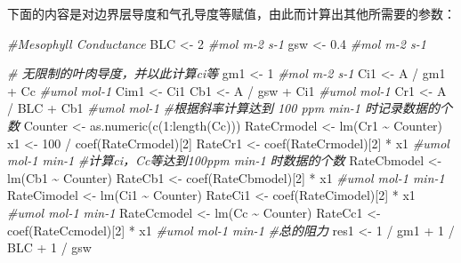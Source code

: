 \documentclass[
]{krantz}
\makeatletter
\newenvironment{Shaded}{\begin{snugshade}}{\end{snugshade}}
\newcommand{\CommentTok}[1]{\textcolor[rgb]{0.56,0.35,0.01}{\textit{#1}}}
\newcommand{\DecValTok}[1]{\textcolor[rgb]{0.00,0.00,0.81}{#1}}
\newcommand{\FloatTok}[1]{\textcolor[rgb]{0.00,0.00,0.81}{#1}}
\newcommand{\FunctionTok}[1]{\textcolor[rgb]{0.00,0.00,0.00}{#1}}
\newcommand{\NormalTok}[1]{#1}
\newcommand{\OtherTok}[1]{\textcolor[rgb]{0.56,0.35,0.01}{#1}}
\newcommand{\SpecialCharTok}[1]{\textcolor[rgb]{0.00,0.00,0.00}{#1}}
\newenvironment{kframe}{%
\medskip{}
\setlength{\fboxsep}{.8em}
 \def\at@end@of@kframe{}%
 \ifinner\ifhmode%
  \def\at@end@of@kframe{\end{minipage}}%
  \begin{minipage}{\columnwidth}%
 \fi\fi%
 \def\FrameCommand##1{\hskip\@totalleftmargin \hskip-\fboxsep
 \colorbox{shadecolor}{##1}\hskip-\fboxsep
     \hskip-\linewidth \hskip-\@totalleftmargin \hskip\columnwidth}%
 \MakeFramed {\advance\hsize-\width
   \@totalleftmargin\z@ \linewidth\hsize
   \@setminipage}}%
 {\par\unskip\endMakeFramed%
 \at@end@of@kframe}
\renewenvironment{Shaded}{\begin{kframe}}{\end{kframe}}
\makeatother
\begin{document}
下面的内容是对边界层导度和气孔导度等赋值，由此而计算出其他所需要的参数：

\begin{Shaded}
\begin{Highlighting}[]
\CommentTok{\#Mesophyll Conductance}
\NormalTok{BLC }\OtherTok{\textless{}{-}} \DecValTok{2} \CommentTok{\#mol m{-}2 s{-}1}
\NormalTok{gsw }\OtherTok{\textless{}{-}} \FloatTok{0.4} \CommentTok{\#mol m{-}2 s{-}1}

\CommentTok{\# 无限制的叶肉导度，并以此计算ci等}
\NormalTok{gm1 }\OtherTok{\textless{}{-}} \DecValTok{1} \CommentTok{\#mol m{-}2 s{-}1}
\NormalTok{Ci1 }\OtherTok{\textless{}{-}}\NormalTok{ A }\SpecialCharTok{/}\NormalTok{ gm1 }\SpecialCharTok{+}\NormalTok{ Cc }\CommentTok{\#umol mol{-}1}
\NormalTok{Cim1 }\OtherTok{\textless{}{-}}\NormalTok{ Ci1}
\NormalTok{Cb1 }\OtherTok{\textless{}{-}}\NormalTok{ A }\SpecialCharTok{/}\NormalTok{ gsw }\SpecialCharTok{+}\NormalTok{ Ci1 }\CommentTok{\#umol mol{-}1}
\NormalTok{Cr1 }\OtherTok{\textless{}{-}}\NormalTok{ A }\SpecialCharTok{/}\NormalTok{ BLC }\SpecialCharTok{+}\NormalTok{ Cb1 }\CommentTok{\#umol mol{-}1}
\CommentTok{\#根据斜率计算达到 100 ppm min{-}1 时记录数据的个数}
\NormalTok{Counter }\OtherTok{\textless{}{-}} \FunctionTok{as.numeric}\NormalTok{(}\FunctionTok{c}\NormalTok{(}\DecValTok{1}\SpecialCharTok{:}\FunctionTok{length}\NormalTok{(Cc)))}
\NormalTok{RateCrmodel }\OtherTok{\textless{}{-}} \FunctionTok{lm}\NormalTok{(Cr1 }\SpecialCharTok{\textasciitilde{}}\NormalTok{ Counter)}
\NormalTok{x1 }\OtherTok{\textless{}{-}} \DecValTok{100} \SpecialCharTok{/} \FunctionTok{coef}\NormalTok{(RateCrmodel)[}\DecValTok{2}\NormalTok{] }
\NormalTok{RateCr1 }\OtherTok{\textless{}{-}} \FunctionTok{coef}\NormalTok{(RateCrmodel)[}\DecValTok{2}\NormalTok{] }\SpecialCharTok{*}\NormalTok{ x1 }\CommentTok{\#umol mol{-}1 min{-}1}
\CommentTok{\#计算ci，Cc等达到100ppm min{-}1 时数据的个数}
\NormalTok{RateCbmodel }\OtherTok{\textless{}{-}} \FunctionTok{lm}\NormalTok{(Cb1 }\SpecialCharTok{\textasciitilde{}}\NormalTok{ Counter)}
\NormalTok{RateCb1 }\OtherTok{\textless{}{-}} \FunctionTok{coef}\NormalTok{(RateCbmodel)[}\DecValTok{2}\NormalTok{] }\SpecialCharTok{*}\NormalTok{ x1 }\CommentTok{\#umol mol{-}1 min{-}1}
\NormalTok{RateCimodel }\OtherTok{\textless{}{-}} \FunctionTok{lm}\NormalTok{(Ci1 }\SpecialCharTok{\textasciitilde{}}\NormalTok{ Counter)}
\NormalTok{RateCi1 }\OtherTok{\textless{}{-}} \FunctionTok{coef}\NormalTok{(RateCimodel)[}\DecValTok{2}\NormalTok{] }\SpecialCharTok{*}\NormalTok{ x1 }\CommentTok{\#umol mol{-}1 min{-}1}
\NormalTok{RateCcmodel }\OtherTok{\textless{}{-}} \FunctionTok{lm}\NormalTok{(Cc }\SpecialCharTok{\textasciitilde{}}\NormalTok{ Counter)}
\NormalTok{RateCc1 }\OtherTok{\textless{}{-}} \FunctionTok{coef}\NormalTok{(RateCcmodel)[}\DecValTok{2}\NormalTok{] }\SpecialCharTok{*}\NormalTok{ x1 }\CommentTok{\#umol mol{-}1 min{-}1}
\CommentTok{\#总的阻力}
\NormalTok{res1 }\OtherTok{\textless{}{-}} \DecValTok{1} \SpecialCharTok{/}\NormalTok{ gm1 }\SpecialCharTok{+} \DecValTok{1} \SpecialCharTok{/}\NormalTok{ BLC }\SpecialCharTok{+} \DecValTok{1} \SpecialCharTok{/}\NormalTok{ gsw}


\end{Highlighting}
\end{Shaded}
\end{document}
